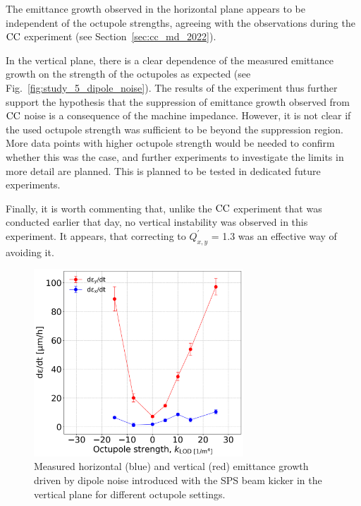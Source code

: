 The emittance growth observed in the horizontal plane appears to be independent of the octupole strengths, agreeing with the observations during the ${\mathrm{CC}}$ experiment (see Section~\ref{sec:cc_md_2022}). 

In the vertical plane, there is a clear dependence of the measured emittance growth on the strength of the octupoles as expected (see Fig.~\ref{fig:study_5_dipole_noise}). The results of the experiment thus further support the hypothesis that the suppression of emittance growth observed from ${\mathrm{CC}}$ noise is a consequence of the machine impedance. However, it is not clear if the used octupole strength was sufficient to be beyond the suppression region. More data points with higher octupole strength would be needed to confirm whether this was the case, and further experiments to investigate the limits in more detail are planned. This is planned to be tested in dedicated future experiments.

Finally, it is worth commenting that, unlike the ${\mathrm{CC}}$ experiment that was conducted earlier that day, no vertical instability was observed in this experiment. It appears, that correcting to $Q^\prime_{x,y}$ = 1.3 was an effective way of avoiding it.
  

\begin{figure}[!h]
   \centering         
   \includegraphics[width=0.7\textwidth]{images/Ch8/emitGrowth_H_V_dipole_noise_damper_md_measurements.png}
       \caption{Measured horizontal (blue) and vertical (red) emittance growth driven by dipole noise introduced with the SPS beam kicker in the vertical plane for different octupole settings.}
       \label{fig:coast_dipole_noise_damper_md_2022_measurement}
\end{figure}

